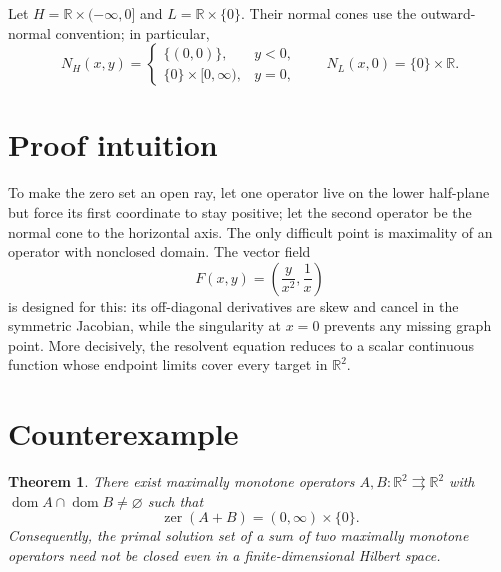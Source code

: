 \documentclass[11pt]{article}
\newtheorem{theorem}{Theorem}
\newcommand{\R}{\mathbb R}
\newcommand{\dom}{\operatorname{dom}}
\newcommand{\zer}{\operatorname{zer}}
\begin{document}
Let $H=\R\times(-\infty,0]$ and $L=\R\times\{0\}$.  Their normal cones use
the outward-normal convention; in particular,
\[
 N_H(x,y)=
 \begin{cases}
 \{(0,0)\},&y<0,\\
 \{0\}\times[0,\infty),&y=0,
 \end{cases}
 \qquad
 N_L(x,0)=\{0\}\times\R.
\]

\section{Proof intuition}

To make the zero set an open ray, let one operator live on the lower
half-plane but force its first coordinate to stay positive; let the second
operator be the normal cone to the horizontal axis.  The only difficult point
is maximality of an operator with nonclosed domain.  The vector field
\[
 F(x,y)=\left(\frac{y}{x^2},\frac1x\right)
\]
is designed for this: its off-diagonal derivatives are skew and cancel in the
symmetric Jacobian, while the singularity at $x=0$ prevents any missing graph
point.  More decisively, the resolvent equation reduces to a scalar continuous
function whose endpoint limits cover every target in $\R^2$.

\section{Counterexample}

\begin{theorem}
There exist maximally monotone operators
$A,B:\R^2\rightrightarrows\R^2$ with
$\dom A\cap\dom B\ne\varnothing$ such that
\[
 \zer(A+B)=(0,\infty)\times\{0\}.
\]
Consequently, the primal solution set of a sum of two maximally monotone
operators need not be closed even in a finite-dimensional Hilbert space.
\end{theorem}
\end{document}
